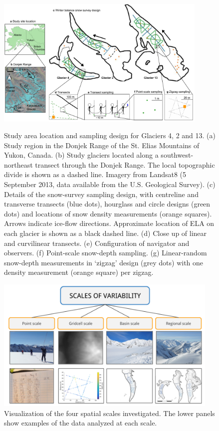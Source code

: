 \documentclass{sfuthesis}
\begin{document}
\begin{figure}
	\centering
	\includegraphics[width =0.9\textwidth]{Sampling.pdf}\\
	\caption{Study area location and sampling design for Glaciers 4, 2 and 13. (a) Study region in the Donjek Range of the St. Elias Mountains of Yukon, Canada. (b) Study glaciers located along a southwest-northeast transect through the Donjek Range. The local topographic divide is shown as a dashed line. Imagery from Landsat8 (5 September 2013, data available from the U.S. Geological Survey). (c) Details of the snow-survey sampling design, with centreline and transverse transects (blue dots), hourglass and circle designs (green dots) and locations of snow density measurements (orange squares). Arrows indicate ice-flow directions. Approximate location of ELA on each glacier is shown as a black dashed line. (d) Close up of linear and curvilinear transects. (e) Configuration of navigator and observers. (f) Point-scale snow-depth sampling. (g) Linear-random snow-depth measurements in `zigzag' design (grey dots) with one density measurement (orange square) per zigzag.}
	\label{fig:Sampling}
\end{figure}


 \begin{figure}
           \includegraphics[width = 0.95\textwidth]{ScalesOfVariability.png}
       \caption{Visualization of the four spatial scales investigated. The lower panels show examples of the data analyzed at each scale.}
       \label{fig:flowchart_scales}
\end{figure}
\end{document}
